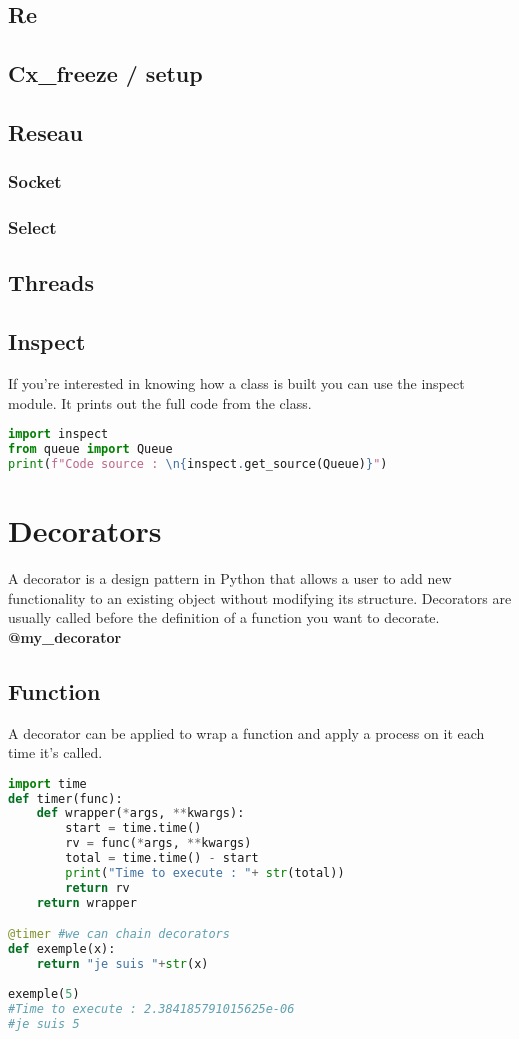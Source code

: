 \documentclass[a4paper, 12pt]{article}
\begin{document}
\subsection{Re}
\subsection{Cx\_freeze / setup}
\subsection{Reseau}
\subsubsection{Socket}
\subsubsection{Select}
\subsection{Threads}
\subsection{Inspect}
If you're interested in knowing how a class is built you can use the inspect module. It prints out the full code from the class.
\begin{lstlisting}[language=Python]
import inspect
from queue import Queue
print(f"Code source : \n{inspect.get_source(Queue)}")
\end{lstlisting}

\newpage
\section{Decorators}
A decorator is a design pattern in Python that allows a user to add new functionality to an existing object without modifying its structure. Decorators are usually called before the definition of a function you want to decorate. \textbf{@my\_decorator}\newline
\subsection{Function}
A decorator can be applied to wrap a function and apply a process on it each time it's called.
\begin{lstlisting}[language=Python]
import time
def timer(func):
	def wrapper(*args, **kwargs):
		start = time.time()
		rv = func(*args, **kwargs)
		total = time.time() - start
		print("Time to execute : "+ str(total))
		return rv
	return wrapper

@timer #we can chain decorators
def exemple(x):
	return "je suis "+str(x)
	
exemple(5)
#Time to execute : 2.384185791015625e-06
#je suis 5
\end{lstlisting}
\end{document}
